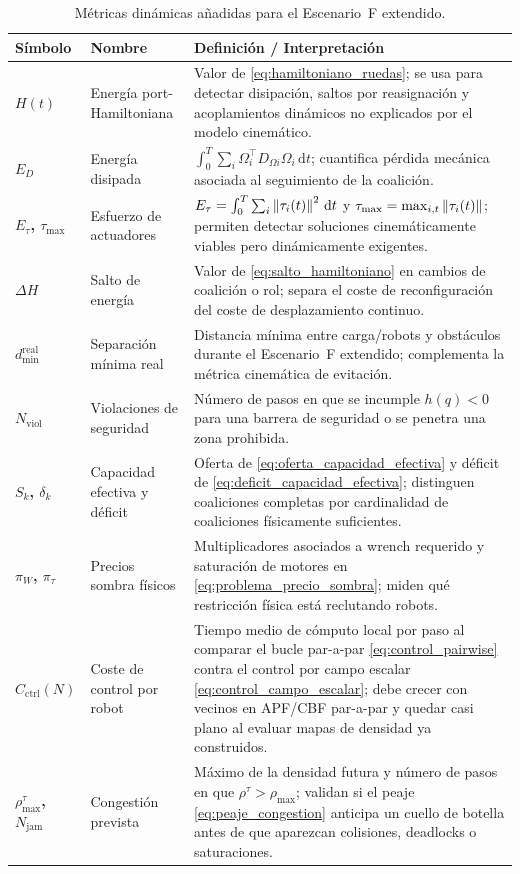 \begin{table}[htbp]
\centering
\small
\caption[Métricas dinámicas del Escenario F extendido]{Métricas dinámicas añadidas para el Escenario~F extendido.}
\label{tab:metricas_dinamicas}
\begin{tabularx}{\textwidth}{@{}>{\bfseries}p{}p{}Y@{}}
\toprule
Símbolo & Nombre & Definición / Interpretación \\
\midrule
$H(t)$ & Energía port-Hamiltoniana &
  Valor de \eqref{eq:hamiltoniano_ruedas}; se usa para detectar disipación,
  saltos por reasignación y acoplamientos dinámicos no explicados por el modelo
  cinemático. \\
$E_D$ & Energía disipada &
  $\int_0^T \sum_i \Omega_i^\top D_{\Omega i}\Omega_i\,\mathrm{d}t$; cuantifica
  pérdida mecánica asociada al seguimiento de la coalición. \\
$E_{\tau}$, $\tau_{\max}$ & Esfuerzo de actuadores &
  $E_{\tau}=\int_0^T\sum_i \left\|\tau_i(t)\right\|^2\,\mathrm{d}t$ y
  $\tau_{\max}=\max_{i,t}\left\|\tau_i(t)\right\|$; permiten detectar soluciones
  cinemáticamente viables pero dinámicamente exigentes. \\
$\Delta H$ & Salto de energía &
  Valor de \eqref{eq:salto_hamiltoniano} en cambios de coalición o rol; separa
  el coste de reconfiguración del coste de desplazamiento continuo. \\
$d_{\min}^{\mathrm{real}}$ & Separación mínima real &
  Distancia mínima entre carga/robots y obstáculos durante el Escenario~F extendido;
  complementa la métrica cinemática de evitación. \\
$N_{\mathrm{viol}}$ & Violaciones de seguridad &
  Número de pasos en que se incumple $h(q)<0$ para una barrera de seguridad o se
  penetra una zona prohibida. \\
$S_k$, $\delta_k$ & Capacidad efectiva y déficit &
  Oferta de \eqref{eq:oferta_capacidad_efectiva} y déficit de
  \eqref{eq:deficit_capacidad_efectiva}; distinguen coaliciones completas por
  cardinalidad de coaliciones físicamente suficientes. \\
$\pi_W$, $\pi_{\tau}$ & Precios sombra físicos &
  Multiplicadores asociados a wrench requerido y saturación de motores en
  \eqref{eq:problema_precio_sombra}; miden qué restricción física está reclutando
  robots. \\
$C_{\mathrm{ctrl}}(N)$ & Coste de control por robot &
  Tiempo medio de cómputo local por paso al comparar el bucle par-a-par
  \eqref{eq:control_pairwise} contra el control por campo escalar
  \eqref{eq:control_campo_escalar}; debe crecer con vecinos en APF/CBF par-a-par y
  quedar casi plano al evaluar mapas de densidad ya construidos. \\
$\rho_{\max}^{\tau}$, $N_{\mathrm{jam}}$ & Congestión prevista &
  Máximo de la densidad futura y número de pasos en que
  $\rho^\tau>\rho_{\max}$; validan si el peaje \eqref{eq:peaje_congestion} anticipa un
  cuello de botella antes de que aparezcan colisiones, deadlocks o saturaciones. \\
\bottomrule
\end{tabularx}
\end{table}

